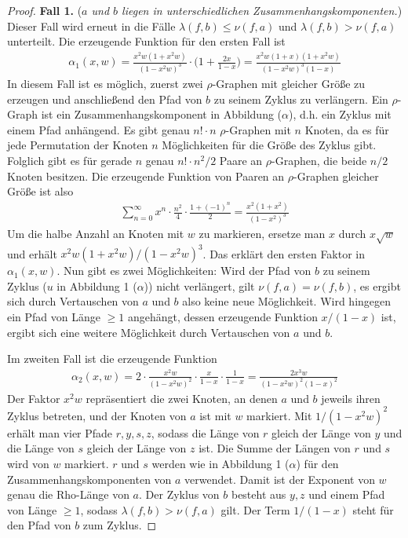 \documentclass[a4paper, 10pt, ngerman]{article}
\begin{document}
\begin{proof}
    \textbf{Fall 1.} (\emph{$a$ und $b$ liegen in unterschiedlichen Zusammenhangskomponenten.}) Dieser Fall wird erneut in die Fälle $\lambda(f, b) \le \nu(f, a)$ und $\lambda(f, b) > \nu(f, a)$ unterteilt. Die erzeugende Funktion für den ersten Fall ist
    \begin{align*}
        \alpha_1(x, w) = \frac {x^2w(1 + x^2w)} {(1 - x^2w)^3} \cdot \Bigg (1 + \frac {2x} {1 - x} \Bigg ) = \frac {x^2w(1 + x)(1 + x^2w)} {(1 - x^2w)^3(1 - x)}
    \end{align*}
    In diesem Fall ist es möglich, zuerst zwei $\rho$-Graphen mit gleicher Größe zu erzeugen und anschließend den Pfad von $b$ zu seinem Zyklus zu verlängern. Ein $\rho$-Graph ist ein Zusammenhangskomponent in Abbildung ($\alpha$), d.h. ein Zyklus mit einem Pfad anhängend. Es gibt genau $n! \cdot n$ $\rho$-Graphen mit $n$ Knoten, da es für jede Permutation der Knoten $n$ Möglichkeiten für die Größe des Zyklus gibt. Folglich gibt es für gerade $n$ genau $n! \cdot n^2/2$ Paare an $\rho$-Graphen, die beide $n/2$ Knoten besitzen. Die erzeugende Funktion von Paaren an $\rho$-Graphen gleicher Größe ist also
    \begin{align*}
        \sum_{n = 0}^\infty x^n \cdot \frac {n^2} 4 \cdot \frac {1 + (-1)^n} 2 = \frac {x^2(1 + x^2)} {(1 - x^2)^3}
    \end{align*}
    Um die halbe Anzahl an Knoten mit $w$ zu markieren, ersetze man $x$ durch $x \sqrt w$ und erhält $x^2w(1 + x^2w) / (1 - x^2w)^3$. Das erklärt den ersten Faktor in $\alpha_1(x, w)$. Nun gibt es zwei Möglichkeiten: Wird der Pfad von $b$ zu seinem Zyklus ($u$ in Abbildung 1 ($\alpha$)) nicht verlängert, gilt $\nu(f, a) = \nu(f, b)$, es ergibt sich durch Vertauschen von $a$ und $b$ also keine neue Möglichkeit. Wird hingegen ein Pfad von Länge $\ge 1$ angehängt, dessen erzeugende Funktion $x/(1 - x)$ ist, ergibt sich eine weitere Möglichkeit durch Vertauschen von $a$ und $b$.

    Im zweiten Fall ist die erzeugende Funktion
    \begin{align*}
        \alpha_2(x, w) = 2 \cdot \frac {x^2w} {(1 - x^2w)^2} \cdot  \frac x {1 - x} \cdot \frac {1}{1 - x} = \frac {2x^3w} {(1 - x^2w)^2 (1 - x)^2}
    \end{align*}
    Der Faktor $x^2w$ repräsentiert die zwei Knoten, an denen $a$ und $b$ jeweils ihren Zyklus betreten, und der Knoten von $a$ ist mit $w$ markiert. Mit $1 / (1 - x^2w)^2$ erhält man vier Pfade $r, y, s, z$, sodass die Länge von $r$ gleich der Länge von $y$ und die Länge von $s$ gleich der Länge von $z$ ist. Die Summe der Längen von $r$ und $s$ wird von $w$ markiert. $r$ und $s$ werden wie in Abbildung 1 ($\alpha$) für den Zusammenhangskomponenten von $a$ verwendet. Damit ist der Exponent von $w$ genau die Rho-Länge von $a$. Der Zyklus von $b$ besteht aus $y, z$ und einem Pfad von Länge $\ge 1$, sodass $\lambda(f, b) > \nu(f, a)$ gilt. Der Term $1 / (1 - x)$ steht für den Pfad von $b$ zum Zyklus.


\end{proof}
\end{document}
